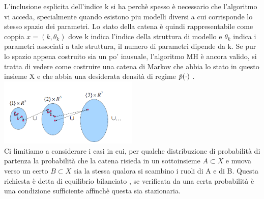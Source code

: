 L’inclusione esplicita dell’indice k si ha perchè spesso è necessario che l’algoritmo vi
acceda, specialmente quando esistono piu modelli diversi a cui corrisponde lo stesso
spazio dei parametri.
Lo stato della catena è quindi rappresentabile come coppia $x = (k, \theta_k )$ dove k indica
l’indice della struttura di modello e $\theta_k$ indica i parametri associati a tale struttura,
il numero di parametri dipende da k.
Se pur lo spazio appena costruito sia un po’ inusuale, l’algoritmo MH è ancora
valido, si tratta di vedere come costruire una catena di Markov che abbia lo stato
in questo insieme X e che abbia una desiderata densità di regime $\hat{p}(\cdot)$ .\\
\includegraphics[width=0.5\textwidth]{RJMCMCImage.png}\\ 
Ci limitiamo a considerare i casi in cui, per qualche distribuzione di probabilità di
partenza la probabilità che la catena risieda in un sottoinsieme $A \subset X$ e muova
verso un certo $B\subset X$ sia la stessa qualora si scambino i ruoli di A e di B. Questa
richiesta è detta di equilibrio bilanciato , se verificata da una certa probabilità è una
condizione sufficiente affinchè questa sia stazionaria.


